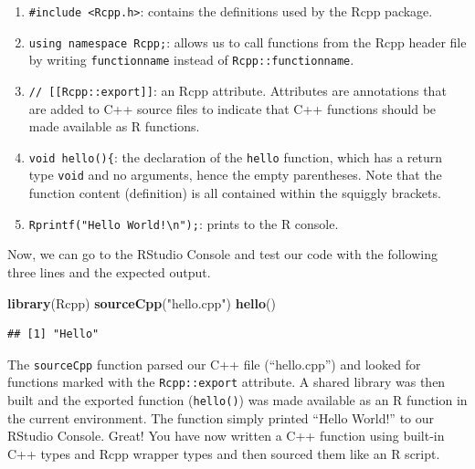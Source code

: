 \documentclass[
]{krantz}
\newenvironment{Shaded}{\begin{snugshade}}{\end{snugshade}}
\newcommand{\KeywordTok}[1]{\textcolor[rgb]{0.13,0.29,0.53}{\textbf{#1}}}
\newcommand{\NormalTok}[1]{#1}
\newcommand{\StringTok}[1]{\textcolor[rgb]{0.31,0.60,0.02}{#1}}
\providecommand{\tightlist}{%
  \setlength{\itemsep}{0pt}\setlength{\parskip}{0pt}}
\begin{document}
\begin{enumerate}
\def\labelenumi{\arabic{enumi}.}
\tightlist
\item
  \texttt{\#include\ \textless{}Rcpp.h\textgreater{}}: contains the definitions used by the Rcpp package.

  \item

  \texttt{using\ namespace\ Rcpp;}: allows us to call functions from the Rcpp header file by writing \texttt{functionname} instead of \texttt{Rcpp::functionname}.

  \item

  \texttt{//\ {[}{[}Rcpp::export{]}{]}}: an Rcpp attribute. Attributes are annotations that are added to C++ source files to indicate that C++ functions should be made available as R functions.

  \item

  \texttt{void\ hello()\{}: the declaration of the \texttt{hello} function, which has a return type \texttt{void} and no arguments, hence the empty parentheses. Note that the function content (definition) is all contained within the squiggly brackets.

  \item

  \texttt{Rprintf("Hello\ World!\textbackslash{}n");}: prints to the R console.
\end{enumerate}

Now, we can go to the RStudio Console and test our code with the following three lines and the expected output.

\begin{Shaded}
\begin{Highlighting}[]
\KeywordTok{library}\NormalTok{(Rcpp)}
\KeywordTok{sourceCpp}\NormalTok{(}\StringTok{"hello.cpp"}\NormalTok{)}
\KeywordTok{hello}\NormalTok{()}
\end{Highlighting}
\end{Shaded}

\begin{verbatim}
## [1] "Hello"
\end{verbatim}

The \texttt{sourceCpp} function parsed our C++ file (``hello.cpp'') and looked for functions marked with the \texttt{Rcpp::export} attribute. A shared library was then built and the exported function (\texttt{hello()}) was made available as an R function in the current environment. The function simply printed ``Hello World!'' to our RStudio Console. Great! You have now written a C++ function using built-in C++ types and Rcpp wrapper types and then sourced them like an R script.
\end{document}
